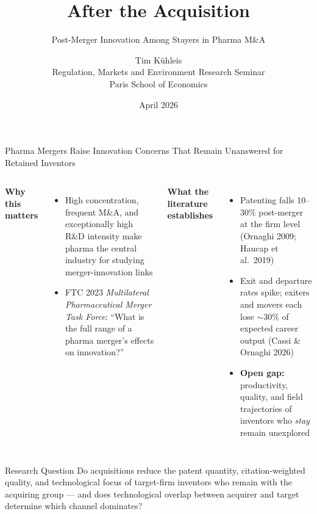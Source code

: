 \documentclass[10pt,aspectratio=169]{beamer}
\title[Stayers' Innovation in Pharma M\&A]{\textbf{After the Acquisition}}
\subtitle{Post-Merger Innovation Among Stayers in Pharma M\&A}
\author{Tim K\"{u}hleis \\[0.5em]
        \small Regulation, Markets and Environment Research Seminar\\[-0.1em]
        \small Paris School of Economics}
\date{April 2026}
\begin{document}
\begin{frame}
  \titlepage
\end{frame}

\begin{frame}{Pharma Mergers Raise Innovation Concerns That Remain Unanswered for Retained Inventors}

\begin{columns}[T]

  \textbf{Why this matters}
  \begin{itemize}\small
    \item High concentration, frequent M\&A, and exceptionally high R\&D intensity make pharma the central industry for studying merger-innovation links
    \item FTC 2023 \textit{Multilateral Pharmaceutical Merger Task Force}: ``What is the full range of a pharma merger's effects on innovation?''
  \end{itemize}

  \textbf{What the literature establishes}
  \begin{itemize}\small
    \item Patenting falls 10--30\% post-merger at the firm level (Ornaghi 2009; Haucap et al.\ 2019)
    \item Exit and departure rates spike; exiters and movers each lose ${\sim}$30\% of expected career output (Cassi \& Ornaghi 2026)
    \item \textbf{Open gap:} productivity, quality, and field trajectories of inventors who \textit{stay} remain unexplored
  \end{itemize}

\end{columns}

\vspace{0.5em}
\begin{block}{Research Question}
\small Do acquisitions reduce the patent quantity, citation-weighted quality, and technological focus of target-firm inventors who remain with the acquiring group --- and does technological overlap between acquirer and target determine which channel dominates?
\end{block}

\end{frame}
\end{document}
